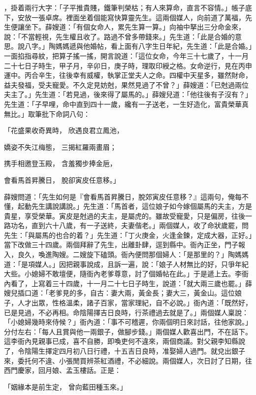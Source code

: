 ，掛着兩行大字：「子平推貴賤，鐵筆判榮枯；有人來算命，直言不容情。」帳子底下，安放一張卓席。裡面坐着個能寫快算靈先生。這兩個媒人，向前道了萬福，先生便讓坐下。薛嫂道：「有個女命人，累先生算一算。」向袖中拏出三分命金來，說：「不當輕視，先生權且收了。路過不曾多帶錢來。」先生道：「此是合婚的意思。說八字。」陶媽媽遞與他婚帖，看上面有八字生日年紀，先生道：「此是合婚。」一面掐指尋紋，把算子搖一搖，開言說道：「這位女命，今年三十七歲了，十一月二十七日子時生，甲子月，辛卯日，庚子時，理取印綬之格。女命逆行，見在丙申運中。丙合辛生，往後幸有威權，執掌正堂夫人之命。四權中天星多，雖然財命，益夫發福，受夫寵愛。不久定見妨尅，果然見過了不曾？」薛嫂道：「已尅過兩位夫主了。」先生道：「若見過，後來得了屬馬的。」薛嫂兒道：「他往後有子沒有？」先生道：「子早哩，命中直到四十一歲，纔有一子送老，一生好造化，富貴榮華真無比。」取筆批下命詞八句：

「花盛果收奇異時，  欣遇良君立鳳池，

嬌姿不失江梅態，  三揭紅羅兩畫眉；

携手相邀登玉殿，  含羞獨步捧金巵，

會看馬首昇騰日，  脫卻寅皮任意移。」

薛嫂問道：「先生如何是『會看馬首昇騰日，脫郊寅皮任意移？』這兩句，俺每不懂，起動先生講說講說。」先生道：「馬首者，這位娘子如今嫁個屬馬的夫主，方是貴星，享受榮華。寅皮是尅過的夫主，是屬虎的。雖故受寵愛，只是偏房，往後一路功名，直到六十八歲，有一子送終，夫妻偕老。」兩個媒人，收了命狀歲罷，問先生：「與屬馬的也合的着？」先生道：「丁火庚金，火逢金鍊，定成大器，正好。」當下改做三十四歲。兩個拜辭了先生，出離卦肆，逕到縣中。衙內正坐，門子報入，良久，喚進陶嫂。二嫂旋下磕頭。衙內便問那個婦人：「是那里的？」陶媽媽道：「是項媒人。」因把親事說成，且訴一遍，說：「娘子人材無比的好，只爭年紀大些。小媳婦不敢壇便，隨衙內老爹尊意，討了個婚帖在此。」于是遞上去。李衙內看了，上寫着三十四歲，十一月二十七日子時生，說道：「就大兩三歲也罷。」薛嫂兒插口道：「老爹見的多，自古：妻大兩，黃金長；妻大三，黃金山。這位娘子，人才出眾，性格溫柔，諸子百家，當家理紀，自不必說。」衙內道：「既然好，已是見過，不必再相。命陰陽擇吉日良時，行茶禮過去就是了。」兩個媒人稟說：「小媳婦幾時來侍候？」衙內道：「事不可稽遲，你兩個明日來討話，往他家說。」分付左右：「每人且賞與他一兩銀子，做腳步錢。」兩個媒人歡喜出門，不在話下。這李衙內見親事已成，喜不自勝，即喚吏何不違來，兩個商議。對父親李知縣說了，令陰陽生擇定四月初八日行禮，十五吉日良時，准娶婦人過門。就兌出銀子來，委托何不違、小張閒買辨茶紅酒禮，不必細說。兩個媒人，次日討了日期，往西門慶家，回月娘、孟玉樓話。正是：

「姻緣本是前生定，  曾向藍田種玉來。」

